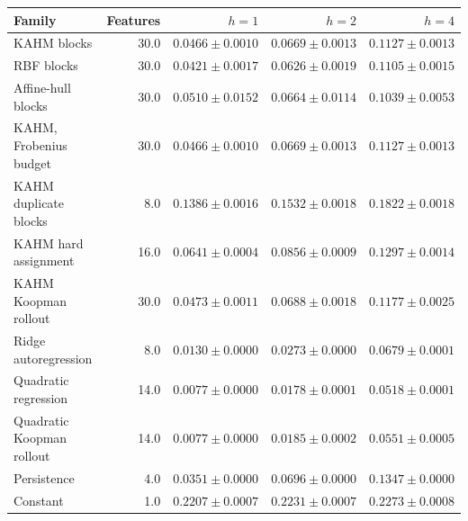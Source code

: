\begin{tabular}{lrrrr}
\toprule
Family & Features & $h=1$ & $h=2$ & $h=4$ \\
\midrule
KAHM blocks & 30.0 & $0.0466\pm0.0010$ & $0.0669\pm0.0013$ & $0.1127\pm0.0013$ \\
RBF blocks & 30.0 & $0.0421\pm0.0017$ & $0.0626\pm0.0019$ & $0.1105\pm0.0015$ \\
Affine-hull blocks & 30.0 & $0.0510\pm0.0152$ & $0.0664\pm0.0114$ & $0.1039\pm0.0053$ \\
KAHM, Frobenius budget & 30.0 & $0.0466\pm0.0010$ & $0.0669\pm0.0013$ & $0.1127\pm0.0013$ \\
KAHM duplicate blocks & 8.0 & $0.1386\pm0.0016$ & $0.1532\pm0.0018$ & $0.1822\pm0.0018$ \\
KAHM hard assignment & 16.0 & $0.0641\pm0.0004$ & $0.0856\pm0.0009$ & $0.1297\pm0.0014$ \\
KAHM Koopman rollout & 30.0 & $0.0473\pm0.0011$ & $0.0688\pm0.0018$ & $0.1177\pm0.0025$ \\
Ridge autoregression & 8.0 & $0.0130\pm0.0000$ & $0.0273\pm0.0000$ & $0.0679\pm0.0001$ \\
Quadratic regression & 14.0 & $0.0077\pm0.0000$ & $0.0178\pm0.0001$ & $0.0518\pm0.0001$ \\
Quadratic Koopman rollout & 14.0 & $0.0077\pm0.0000$ & $0.0185\pm0.0002$ & $0.0551\pm0.0005$ \\
Persistence & 4.0 & $0.0351\pm0.0000$ & $0.0696\pm0.0000$ & $0.1347\pm0.0000$ \\
Constant & 1.0 & $0.2207\pm0.0007$ & $0.2231\pm0.0007$ & $0.2273\pm0.0008$ \\
\bottomrule
\end{tabular}
